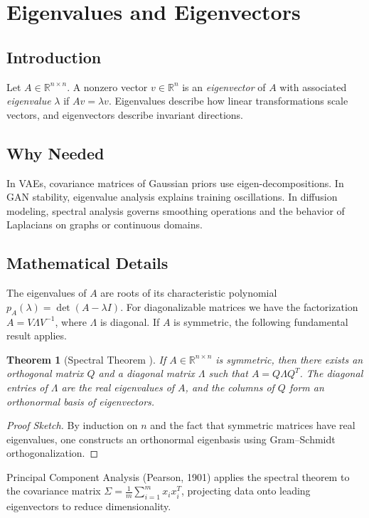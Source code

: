 \documentclass[11pt]{book}
\newtheorem{theorem}{Theorem}[chapter]
\begin{document}
\section{Eigenvalues and Eigenvectors}
\subsection{Introduction}
Let $A\in\mathbb{R}^{n\times n}$. A nonzero vector $v\in\mathbb{R}^n$ is an \emph{eigenvector} of $A$ with associated \emph{eigenvalue} $\lambda$ if $Av=\lambda v$. Eigenvalues describe how linear transformations scale vectors, and eigenvectors describe invariant directions.

\subsection{Why Needed}
In VAEs, covariance matrices of Gaussian priors use eigen-decompositions. In GAN stability, eigenvalue analysis explains training oscillations. In diffusion modeling, spectral analysis governs smoothing operations and the behavior of Laplacians on graphs or continuous domains.

\subsection{Mathematical Details}
The eigenvalues of $A$ are roots of its characteristic polynomial $p_A(\lambda)=\det(A-\lambda I)$. For diagonalizable matrices we have the factorization $A=V\Lambda V^{-1}$, where $\Lambda$ is diagonal. If $A$ is symmetric, the following fundamental result applies.

\begin{theorem}[Spectral Theorem \cite{hilbert1904}]
If $A\in\mathbb{R}^{n\times n}$ is symmetric, then there exists an orthogonal matrix $Q$ and a diagonal matrix $\Lambda$ such that $A=Q\Lambda Q^T$. The diagonal entries of $\Lambda$ are the real eigenvalues of $A$, and the columns of $Q$ form an orthonormal basis of eigenvectors.
\end{theorem}
\begin{proof}[Proof Sketch]
By induction on $n$ and the fact that symmetric matrices have real eigenvalues, one constructs an orthonormal eigenbasis using Gram--Schmidt orthogonalization.
\end{proof}
Principal Component Analysis (Pearson, 1901) applies the spectral theorem to the covariance matrix $\Sigma=\tfrac1m\sum_{i=1}^m x_ix_i^T$, projecting data onto leading eigenvectors to reduce dimensionality.
\end{document}
